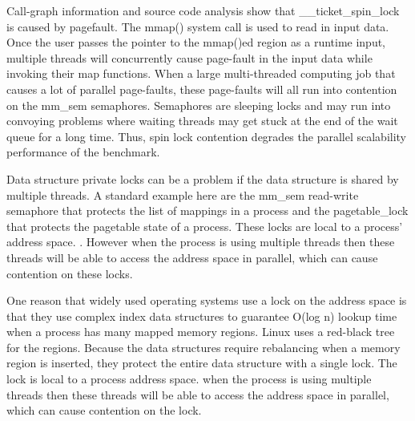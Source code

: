 Call-graph information and source code analysis show that 
\_\_ticket\_spin\_lock is caused by pagefault.
The mmap() system call is used to read in input data. 
Once the user passes the pointer to the mmap()ed region as a runtime input, 
multiple threads will concurrently cause page-fault in the input data
while invoking their map functions.
When a large multi-threaded computing job 
that causes a lot of parallel page-faults, 
these page-faults will all run into contention on the mm\_sem semaphores.
Semaphores are sleeping locks 
and may run into convoying problems 
where waiting threads may 
get stuck at the end of the wait queue for a long time.\cite{Andi2009lmulticore}
Thus, spin lock 
contention degrades the parallel scalability performance of 
the benchmark. 

Data structure private locks can be a problem 
if the data structure is shared by multiple threads. 
A standard example here are the mm\_sem read-write semaphore 
that protects the list of mappings in a process and 
the pagetable\_lock that protects the pagetable state of a process. 
These locks are local to a process’ address space. 
. 
However when the process is using multiple threads 
then these threads will be able to access the address space in parallel,
which can cause contention on these locks.


One reason that widely used operating systems 
use a lock on the address space is 
that they use complex index data structures to guarantee O(log n)
lookup time when a process has many mapped memory
regions. Linux uses a red-black tree for the regions\cite{linux}. 
Because the data structures require rebalancing 
when a memory region is inserted, 
they protect the entire data structure with a single lock.
The lock is local to a process address space.
when the process is using multiple threads 
then these threads will be able to access
the address space in parallel, 
which can cause contention on the lock.

